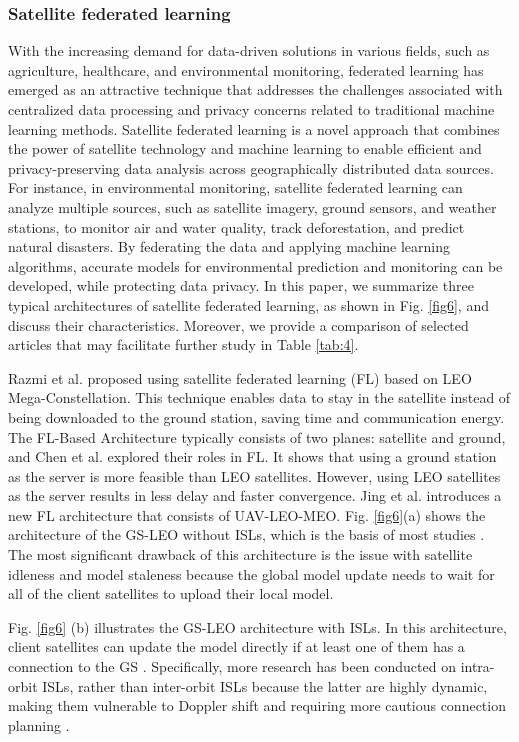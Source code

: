 \documentclass[lettersize,journal]{IEEEtran}
\begin{document}
\subsubsection*{Satellite federated learning}
With the increasing demand for data-driven solutions in various fields, such as agriculture, healthcare, and environmental monitoring, federated learning has emerged as an attractive technique that addresses the challenges associated with centralized data processing and privacy concerns related to traditional machine learning methods. Satellite federated learning is a novel approach that combines the power of satellite technology and machine learning to enable efficient and privacy-preserving data analysis across geographically distributed data sources. For instance, in environmental monitoring, satellite federated learning can analyze multiple sources, such as satellite imagery, ground sensors, and weather stations, to monitor air and water quality, track deforestation, and predict natural disasters. By federating the data and applying machine learning algorithms, accurate models for environmental prediction and monitoring can be developed, while protecting data privacy. In this paper, we summarize three typical architectures of satellite federated learning, as shown in Fig. \ref{fig6}, and discuss their characteristics. Moreover, we provide a comparison of selected articles that may facilitate further study in Table \ref{tab:4}.

Razmi et al. \cite{RN209} proposed using satellite federated learning (FL) based on LEO Mega-Constellation. This technique enables data to stay in the satellite instead of being downloaded to the ground station, saving time and communication energy. The FL-Based Architecture typically consists of two planes: satellite and ground, and Chen et al. \cite{RN225} explored their roles in FL. It shows that using a ground station as the server is more feasible than LEO satellites. However, using LEO satellites as the server results in less delay and faster convergence. Jing et al. \cite{RN214} introduces a new FL architecture that consists of UAV-LEO-MEO. Fig. \ref{fig6}(a) shows the architecture of the GS-LEO without ISLs, which is the basis of most studies \cite{RN209,RN210,RN211}. The most significant drawback of this architecture is the issue with satellite idleness and model staleness because the global model update needs to wait for all of the client satellites to upload their local model.

Fig. \ref{fig6} (b) illustrates the GS-LEO architecture with ISLs. In this architecture, client satellites can update the model directly if at least one of them has a connection to the GS \cite{RN215,RN217}. Specifically, more research has been conducted on intra-orbit ISLs, rather than inter-orbit ISLs because the latter are highly dynamic, making them vulnerable to Doppler shift and requiring more cautious connection planning \cite{RN227}.
\end{document}
